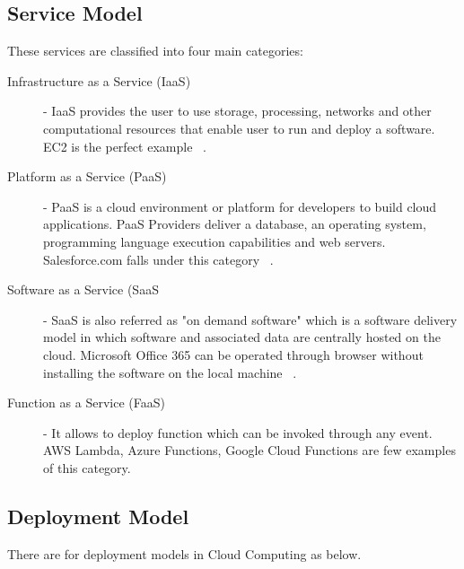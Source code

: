 \subsection{Service Model} These services are classified into four main categories: 

\begin{description}

\item[Infrastructure as a Service (IaaS)] - IaaS provides the user
to use storage, processing, networks and other computational resources
that enable user to run and deploy a software. EC2 is the perfect
example ~\cite{hid-sp18-513-cloud2}. 

\item[Platform as a Service (PaaS)] - PaaS is a cloud environment or
platform for developers to build cloud applications. PaaS Providers
deliver a database, an operating system, programming language execution
capabilities and web servers. Salesforce.com falls under this 
category ~\cite{hid-sp18-513-cloud2}.  

\item[Software as a Service (SaaS] - SaaS is also referred as
"on demand software" which is a software delivery model in which 
software and associated data are centrally hosted on the cloud. 
Microsoft Office 365 can be operated through browser 
without installing the software on the local machine ~\cite{hid-sp18-513-cloud2}. 

\item[Function as a Service (FaaS)] - It allows to deploy function which 
can be invoked through any event. AWS Lambda, Azure Functions, Google 
Cloud Functions are few examples of this category.
\end{description}

\subsection{Deployment Model} There are for deployment models in Cloud
Computing as below.

